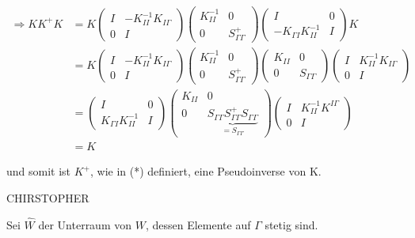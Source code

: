\begin{align*}
  \Rightarrow KK^+K &= 
  K
  \begin{pmatrix}
    I& -K_{II}^{-1}K_{I\Gamma}\\
    0& I
  \end{pmatrix}
  \begin{pmatrix}
    K_{II}^{-1}& 0\\
    0& S_{\Gamma\Gamma}^+
  \end{pmatrix}
  \begin{pmatrix}
    I& 0\\
    -K_{\Gamma I}K_{II}^{-1}& I
  \end{pmatrix}
  K\\
  &=
  K 
 \begin{pmatrix}
    I& -K_{II}^{-1}K_{I\Gamma}\\
    0& I
  \end{pmatrix}
  \begin{pmatrix}
    K_{II}^{-1}& 0\\
    0& S_{\Gamma\Gamma}^+
  \end{pmatrix}
  \begin{pmatrix}
    K_{II}& 0\\
    0& S_{\Gamma\Gamma}
  \end{pmatrix}
  \begin{pmatrix}
    I& K_{II}^{-1}K_{I\Gamma}\\
    0& I
  \end{pmatrix}\\
  &=
  \begin{pmatrix}
    I& 0\\
    K_{\Gamma I}K_{II}^{-1}& I
  \end{pmatrix}
  \begin{pmatrix}
    K_{II}& 0\\
    0&  \underbrace{S_{\Gamma\Gamma}S_{\Gamma\Gamma}^+S_{\Gamma\Gamma}}_{=S_{\Gamma\Gamma}}
  \end{pmatrix}
  \begin{pmatrix}
    I& K_{II}^{-1}K^{I\Gamma}\\
    0& I
  \end{pmatrix}\\
  &= K
\end{align*}


und somit ist $K^+$, wie in (*) definiert, eine Pseudoinverse von K.

CHIRSTOPHER

Sei $\hat{W}$ der Unterraum von $W$, dessen Elemente auf $\Gamma$ stetig sind. 

